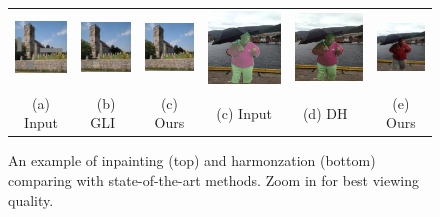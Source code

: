 \begin{figure}[t]
\centering
\setlength\tabcolsep{1pt}
\begin{tabular}{cccccc}
  \includegraphics[width=.16\textwidth]{figures/teaser/000000120572_input_image.jpg}&
  \includegraphics[width=.16\textwidth]{figures/teaser/output_mask17.jpg}&
  \includegraphics[width=.16\textwidth]{figures/teaser/000000120572_synthesized_image.jpg} &
    \includegraphics[width=.16\textwidth]{figures/teaser/input.jpg}&
  \includegraphics[width=.16\textwidth]{figures/teaser/dh.jpg}&
  \includegraphics[width=.16\textwidth]{figures/teaser/ours.jpg} \\
  (a) Input  & (b) GLI~\cite{iizuka2017globally} & (c) Ours & (c) Input  & (d) DH~\cite{tsai2017deep} & (e) Ours  \\
\end{tabular}
\caption{An example of inpainting (top) and harmonzation (bottom) comparing with state-of-the-art methods. Zoom in for best viewing quality.}
\label{fig:teaser}
\vspace{-15pt}
\end{figure}

